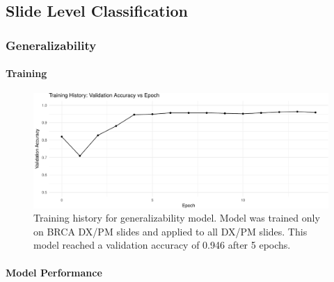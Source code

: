 \documentclass[12pt,]{article}
\let\oldparagraph\paragraph
\renewcommand{\paragraph}[1]{\oldparagraph{#1}\mbox{}}
\begin{document}
\subsection{Slide Level
Classification}\label{slide-level-classification-1}

\subsubsection{Generalizability}\label{generalizability-1}

\paragraph{Training}\label{training}

\begin{figure}[H]

{\centering \includegraphics{figure/graphics-unnamed-chunk-10-1} 

}

\caption{Training history for generalizability model. Model was trained only on BRCA DX/PM slides and applied to all DX/PM slides. This model reached a validation accuracy of 0.946 after 5 epochs.}\label{fig:unnamed-chunk-10}
\end{figure}

\paragraph{Model Performance}\label{model-performance}
\end{document}
